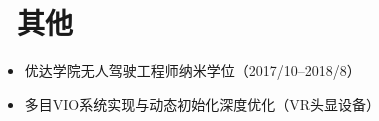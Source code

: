 \documentclass{resume}
\begin{document}

\section{\faCode\ 其他}
\begin{itemize}[parsep=0.5ex]
  \item 优达学院无人驾驶工程师纳米学位（2017/10--2018/8）
  \item 多目VIO系统实现与动态初始化深度优化（VR头显设备）
\end{itemize}

%
%
\end{document}

